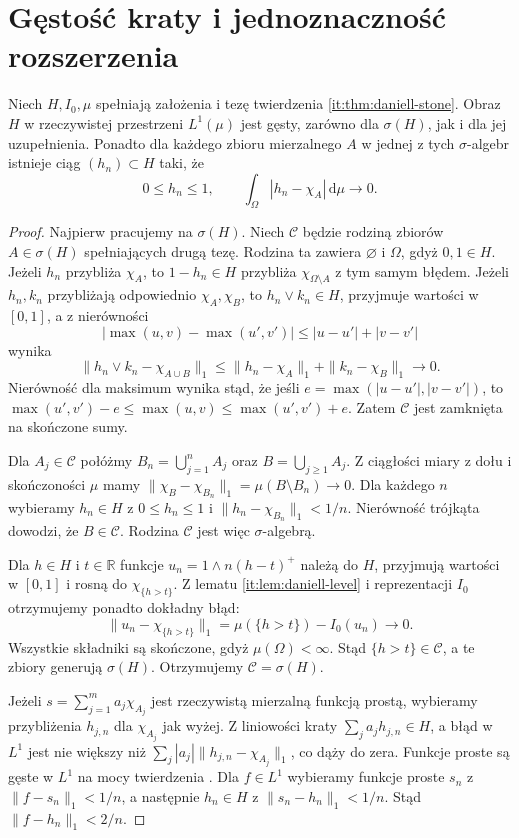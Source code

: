 \section{Gęstość kraty i jednoznaczność rozszerzenia}

\begin{twierdzenie}
\label{it:thm:daniell-l1-density}
Niech $H,I_0,\mu$ spełniają założenia i tezę
twierdzenia \ref{it:thm:daniell-stone}.
Obraz $H$ w rzeczywistej przestrzeni $L^1(\mu)$
jest gęsty, zarówno dla $\sigma(H)$, jak i dla jej
uzupełnienia. Ponadto dla każdego zbioru mierzalnego
$A$ w jednej z tych $\sigma$-algebr istnieje ciąg
$(h_n)\subset H$ taki, że
\[
 0\le h_n\le1,\qquad
 \int_\Omega|h_n-\chi_A|\,\mathrm d\mu\longrightarrow0.
\]
\end{twierdzenie}
\begin{proof}
Najpierw pracujemy na $\sigma(H)$.
Niech $\mathcal C$ będzie rodziną zbiorów $A\in\sigma(H)$
spełniających drugą tezę. Rodzina ta zawiera
$\varnothing$ i $\Omega$, gdyż $0,1\in H$.
Jeżeli $h_n$ przybliża $\chi_A$, to $1-h_n\in H$
przybliża $\chi_{\Omega\setminus A}$ z tym samym błędem.
Jeżeli $h_n,k_n$ przybliżają odpowiednio
$\chi_A,\chi_B$, to $h_n\vee k_n\in H$, przyjmuje
wartości w $[0,1]$, a z nierówności
\[
 |\max(u,v)-\max(u',v')|\le |u-u'|+|v-v'|
\]
wynika
\[
 \|h_n\vee k_n-\chi_{A\cup B}\|_1
 \le\|h_n-\chi_A\|_1+\|k_n-\chi_B\|_1\to0.
\]
Nierówność dla maksimum wynika stąd, że jeśli
$e=\max(|u-u'|,|v-v'|)$, to
$\max(u',v')-e\le\max(u,v)\le\max(u',v')+e$.
Zatem $\mathcal C$ jest zamknięta na skończone sumy.

Dla $A_j\in\mathcal C$ połóżmy
$B_n=\bigcup_{j=1}^n A_j$ oraz $B=\bigcup_{j\ge1}A_j$.
Z ciągłości miary z dołu i skończoności $\mu$ mamy
$\|\chi_B-\chi_{B_n}\|_1=\mu(B\setminus B_n)\to0$.
Dla każdego $n$ wybieramy $h_n\in H$ z $0\le h_n\le1$
i $\|h_n-\chi_{B_n}\|_1<1/n$.
Nierówność trójkąta dowodzi, że $B\in\mathcal C$.
Rodzina $\mathcal C$ jest więc $\sigma$-algebrą.

Dla $h\in H$ i $t\in\mathbb{R}$ funkcje
$u_n=1\wedge n(h-t)^+$ należą do $H$, przyjmują
wartości w $[0,1]$ i rosną do $\chi_{\{h>t\}}$.
Z lematu \ref{it:lem:daniell-level} i reprezentacji
$I_0$ otrzymujemy ponadto dokładny błąd:
\[
 \|u_n-\chi_{\{h>t\}}\|_1
 =\mu(\{h>t\})-I_0(u_n)\longrightarrow0.
\]
Wszystkie składniki są skończone, gdyż $\mu(\Omega)<\infty$.
Stąd $\{h>t\}\in\mathcal C$, a te zbiory generują
$\sigma(H)$. Otrzymujemy $\mathcal C=\sigma(H)$.

Jeżeli $s=\sum_{j=1}^m a_j\chi_{A_j}$ jest rzeczywistą
mierzalną funkcją prostą, wybieramy przybliżenia
$h_{j,n}$ dla $\chi_{A_j}$ jak wyżej. Z liniowości
kraty $\sum_j a_j h_{j,n}\in H$, a błąd w $L^1$
jest nie większy niż $\sum_j |a_j|\|h_{j,n}-\chi_{A_j}\|_1$,
co dąży do zera. Funkcje proste są gęste w $L^1$ na mocy
twierdzenia .
Dla $f\in L^1$ wybieramy funkcje proste $s_n$
z $\|f-s_n\|_1<1/n$, a następnie $h_n\in H$
z $\|s_n-h_n\|_1<1/n$.
Stąd $\|f-h_n\|_1<2/n$.


\end{proof}
